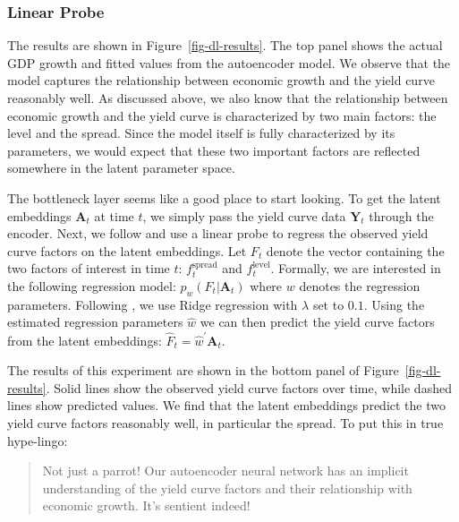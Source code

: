 \documentclass{article}
\theoremstyle{plain}
\theoremstyle{definition}
\theoremstyle{remark}
\begin{document}
\subsubsection{Linear Probe}\label{linear-probe}

The results are shown in Figure~\ref{fig-dl-results}. The top panel
shows the actual GDP growth and fitted values from the autoencoder
model. We observe that the model captures the relationship between
economic growth and the yield curve reasonably well. As discussed above,
we also know that the relationship between economic growth and the yield
curve is characterized by two main factors: the level and the spread.
Since the model itself is fully characterized by its parameters, we
would expect that these two important factors are reflected somewhere in
the latent parameter space.

The bottleneck layer seems like a good place to start looking. To get
the latent embeddings \(\mathbf{A}_t\) at time \(t\), we simply pass the
yield curve data \(\mathbf{Y}_t\) through the encoder. Next, we follow
\cite{gurnee2023language} and use a linear probe to regress the observed
yield curve factors on the latent embeddings. Let \(F_t\) denote the
vector containing the two factors of interest in time \(t\):
\(f_t^{\text{spread}}\) and \(f_t^{\text{level}}\). Formally, we are
interested in the following regression model:
\(p_{w}(F_t|\mathbf{A}_t)\) where \(w\) denotes the regression
parameters. Following \cite{gurnee2023language}, we use Ridge regression
with \(\lambda\) set to \(0.1\). Using the estimated regression
parameters \(\hat{w}\) we can then predict the yield curve factors from
the latent embeddings: \(\hat{F}_t=\hat{w}^{\prime}\mathbf{A}_t\).

The results of this experiment are shown in the bottom panel of
Figure~\ref{fig-dl-results}. Solid lines show the observed yield curve
factors over time, while dashed lines show predicted values. We find
that the latent embeddings predict the two yield curve factors
reasonably well, in particular the spread. To put this in true
hype-lingo:

\begin{quote}
Not just a parrot! Our autoencoder neural network has an implicit
understanding of the yield curve factors and their relationship with
economic growth. It's sentient indeed!
\end{quote}
\end{document}
